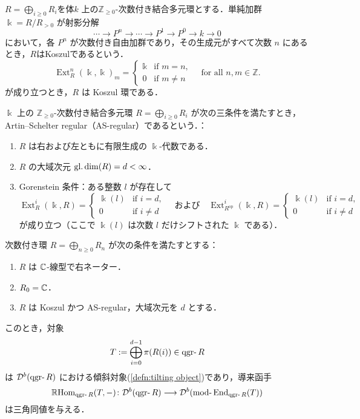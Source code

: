 \begin{defn}[Koszul 環]
	$R = \bigoplus_{i \geq 0} R_i$を体$k$ 上の$\mathbb{Z}_{\geq 0}$-次数付き結合多元環とする．単純加群 $\Bbbk = R / R_{>0}$ が射影分解
\[
\cdots \to P^n \to \cdots \to P^1 \to P^0 \to k \to 0
\]
において，各 $P^n$ が次数付き自由加群であり，その生成元がすべて次数 $n$ にあるとき，$R$はKoszulであるという．
\[
\operatorname{Ext}^n_R(\Bbbk, \Bbbk)_m = 
\begin{cases}
\Bbbk & \text{if } m = n, \\
0 & \text{if } m \ne n
\end{cases}
\quad \text{for all } n, m \in \mathbb{Z}.
\]
が成り立つとき，$R$ は Koszul 環である．
\end{defn}

\begin{defn}
	$\Bbbk$ 上の $\mathbb{Z}_{\geq 0}$-次数付き結合多元環 $R = \bigoplus_{i \geq 0} R_i$ が次の三条件を満たすとき， Artin--Schelter regular（AS-regular）であるという．：\vspace{-3mm}
\begin{enumerate}
  \item $R$ は右および左ともに有限生成の $\Bbbk$-代数である．
  \item $R$ の大域次元 $\operatorname{\mathrm{gl.dim}}(R) = d < \infty$．
  \item Gorenstein 条件：ある整数 $l$ が存在して
  \[
  \operatorname{Ext}^i_R(\Bbbk, R) = 
  \begin{cases}
  \Bbbk(l) & \text{if } i = d, \\
  0 & \text{if } i \ne d
  \end{cases}
  \quad \text{および} \quad
  \operatorname{Ext}^i_{R^\mathrm{op}}(\Bbbk, R) = 
  \begin{cases}
  \Bbbk(l) & \text{if } i = d, \\
  0 & \text{if } i \ne d
  \end{cases}
  \]
  が成り立つ（ここで $\Bbbk(l)$ は次数 $l$ だけシフトされた $\Bbbk$ である）．
\end{enumerate}
\end{defn}

\begin{thm}
\label{thm:tilting_qgr}
次数付き環 \(R = \bigoplus_{n \ge 0} R_n\) が次の条件を満たすとする：

\begin{enumerate}
  \item \(R\) は \({\mathbb C}\)-線型で右ネーター．
  \item \(R_0 = {\mathbb C}\)．
  \item \(R\) は Koszul かつ AS-regular，大域次元を \(d\) とする．
\end{enumerate}

このとき，対象
\[
T := \bigoplus_{i=0}^{d-1} \pi(R(i)) \in \qgr R
\]
は \(\D^b(\qgr R)\) における傾斜対象(\ref{defn:tilting object})であり，導来函手
\[
\RHom_{\qgr R}(T, -) \colon \D^b(\qgr R) \longrightarrow \D^b(\mod \End_{\qgr R}(T))
\]
は三角同値を与える．
\end{thm}

